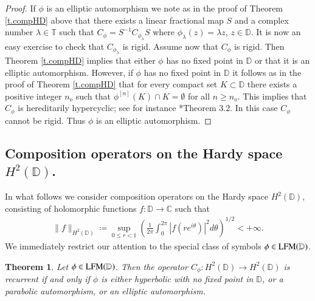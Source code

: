 \documentclass[12pt,leqno]{amsart}
\theoremstyle{plain}
\newtheorem{theorem}[equation]{Theorem}
\theoremstyle{definition}
\numberwithin{equation}{section}
\begin{document}
\begin{proof}
	If $\phi$ is an elliptic automorphism we note as in the proof of Theorem \ref{t.compHD} above that there exists a linear fractional map $S$ and a complex number $\lambda\in \mathbb T$ such that $C_\phi=S^{-1} C_{\phi_\lambda} S$ where $\phi_\lambda (z)=\lambda z$, $z\in\mathbb D$. It is now an easy exercise to check that $C_{\phi_\lambda}$ is rigid. Assume now that $C_\phi$ is rigid. Then Theorem \ref{t.compHD} implies that either $\phi$ has no fixed point in $\mathbb D$ or that it is an elliptic automorphism. However, if $\phi$ has no fixed point in $\mathbb D$ it follows as in the proof of Theorem \ref{t.compHD} that for every compact set $K\subset \mathbb D$ there exists a positive integer $n_o$ such that $ \phi^{[n]}(K)\cap K=\emptyset$ for all $n\geq n_o$. This implies that $C_\phi$ is hereditarily hypercyclic; see for instance \cite{ERMO}*{Theorem 3.2}. In this case $C_\phi$ cannot be rigid. Thus $\phi$ is an elliptic automorphism. 
\end{proof}

\subsection{Composition operators on the Hardy space \texorpdfstring{$H^{2}(\mathbb D)$}{H2(D)}.}

In what follows we consider composition operators on the Hardy space $H^2(\mathbb D)$, consisting of holomorphic functions $f:\mathbb D\to {\mathbb C}$ such that
\begin{align*}
	\| f\|_{H^2(\mathbb D)}\coloneqq \sup_{0\leq r<1}{\left( \frac{1}{2\pi }\int_0^{2\pi }|f(re^{i\theta })|^2 d\theta \right) }^{1/2}<+\infty . 
\end{align*}
We immediately restrict our attention to the special class of symbols $\phi\in {\textnormal{LFM} (\mathbb D)}$.

\begin{theorem}
	\label{t.compH2} Let $\phi\in {\textnormal{LFM} (\mathbb D)}$. Then the operator $C_\phi :H^2(\mathbb D)\to H^2(\mathbb D)$ is recurrent if and only if $\phi$ is either hyperbolic with no fixed point in $\mathbb D$, or a parabolic automorphism, or an elliptic automorphism. 
\end{theorem}
\end{document}
